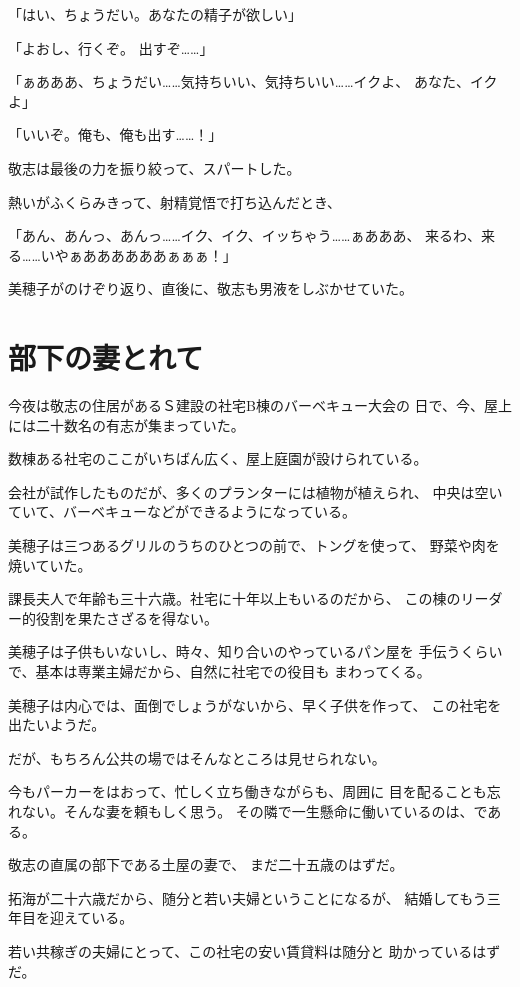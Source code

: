 ﻿\documentclass[
    book,tate,
    line_length=30zw,
    jafontsize=12pt,
    paper=b5j,
    landscape,
    ]{jlreq}
\begin{document}
「はい、ちょうだい。あなたの精子が欲しい」

「よおし、行くぞ。 出すぞ……」

「ぁあああ、ちょうだい……気持ちいい、気持ちいい……イクよ、
あなた、イクよ」

「いいぞ。俺も、俺も出す……！」

敬志は最後の力を振り絞って、スパートした。

熱いがふくらみきって、射精覚悟で打ち込んだとき、

「あん、あんっ、あんっ……イク、イク、イッちゃう……ぁあああ、
来るわ、来る……いやぁああああああぁぁぁ！」

美穂子がのけぞり返り、直後に、敬志も男液をしぶかせていた。

\chapter{部下の妻とれて}

今夜は敬志の住居があるＳ建設の社宅B棟のバーベキュー大会の
日で、今、屋上には二十数名の有志が集まっていた。

数棟ある社宅のここがいちばん広く、屋上庭園が設けられている。

会社が試作したものだが、多くのプランターには植物が植えられ、
中央は空いていて、バーベキューなどができるようになっている。

美穂子は三つあるグリルのうちのひとつの前で、トングを使って、
野菜や肉を焼いていた。

課長夫人で年齢も三十六歳。社宅に十年以上もいるのだから、
この棟のリーダー的役割を果たさざるを得ない。

美穂子は子供もいないし、時々、知り合いのやっているパン屋を
手伝うくらいで、基本は専業主婦だから、自然に社宅での役目も
まわってくる。

美穂子は内心では、面倒でしょうがないから、早く子供を作って、
この社宅を出たいようだ。

だが、もちろん公共の場ではそんなところは見せられない。

今もパーカーをはおって、忙しく立ち働きながらも、周囲に
目を配ることも忘れない。そんな妻を頼もしく思う。
その隣で一生懸命に働いているのは、である。

敬志の直属の部下である土屋の妻で、
まだ二十五歳のはずだ。

拓海が二十六歳だから、随分と若い夫婦ということになるが、
結婚してもう三年目を迎えている。

若い共稼ぎの夫婦にとって、この社宅の安い賃貸料は随分と
助かっているはずだ。
\end{document}
